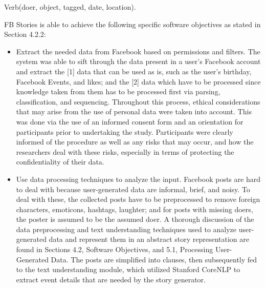 \begin{center} Verb(doer, object, tagged, date, location). \end{center}

FB Stories is able to achieve the following specific software objectives as stated in Section 4.2.2:
\begin{itemize}
	\item Extract the needed data from Facebook based on permissions and filters. \newline\newline
	The system was able to sift through the data present in a user’s Facebook account and extract the [1] data that can be used as is, such as the user’s birthday, Facebook Events, and likes; and the [2] data which have to be processed since knowledge taken from them has to be processed first via parsing, classification, and sequencing. \newline\newline
	Throughout this process, ethical considerations that may arise from the use of personal data were taken into account. This was done via the use of an informed consent form and an orientation for participants prior to undertaking the study. Participants were clearly informed of the procedure as well as any risks that may occur, and how the researchers deal with these risks, especially in terms of protecting the confidentiality of their data. \newline\newline
	
	\item Use data processing techniques to analyze the input. \newline\newline
	Facebook posts are hard to deal with because user-generated data are informal, brief, and noisy. To deal with these, the collected posts have to be preprocessed to remove foreign characters, emoticons, hashtags, laughter; and for posts with missing doers, the poster is assumed to be the assumed doer. A thorough discussion of the data preprocessing and text understanding techniques used to analyze user-generated data and represent them in an abstract story representation are found in Sections 4.2, Software Objectives, and 5.1, Processing User-Generated Data. The posts are simplified into clauses, then subsequently fed to the text understanding module, which utilized Stanford CoreNLP to extract event details that are needed by the story generator. \newline\newline
	

\end{itemize}
